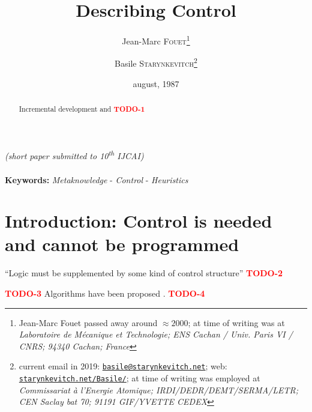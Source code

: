 \documentclass[11pt,a4paper,svgnames]{article}
\begin{document}


\date{august, 1987}

\title{Describing Control}

\author{Jean-Marc \textsc{Fouet}\thanks{Jean-Marc Fouet passed away
    around $\approx 2000$; at time of writing was at \emph{Laboratoire de
      Mécanique et Technologie; ENS Cachan / Univ. Paris VI / CNRS;
      94340 Cachan; France}}
\and
Basile \textsc{Starynkevitch}\thanks{current email in 2019:
    \href{mailto:basile@starynkevitch.net}{\texttt{basile@starynkevitch.net}};
    web:
    \href{http://starynkevitch.net/Basile/}{\texttt{starynkevitch.net/Basile/}};
    at time of writing was employed at \emph{Commissariat à l'Energie
      Atomique; IRDI/DEDR/DEMT/SERMA/LETR; CEN Saclay bat 70; 91191
      GIF/YVETTE CEDEX}}}

  \begin{titlepage}
    \maketitle
  \end{titlepage}

  \begin{center}
    \emph{(short paper submitted to 10\textsuperscript{th} IJCAI)}\\
      {}\\ 
    \textbf{Keywords:} \emph{Metaknowledge} - \emph{Control} - \emph{Heuristics}
  \end{center}
  
  \begin{abstract}
    Incremental development and
    {\textcolor{red}{\textbf{TODO-1}}}
  \end{abstract}

  \section{Introduction: Control is needed and cannot be programmed}
  \label{sec:intro}

  ``Logic must be supplemented by some kind of control structure'' \cite{Simon-Search-1983}
  {\textcolor{red}{\textbf{TODO-2}}}
  
  {\textcolor{red}{\textbf{TODO-3}}}
  Algorithms have been proposed \cite{Forgy-Rete-1982}.
  {\textcolor{red}{\textbf{TODO-4}}}
\end{document}
